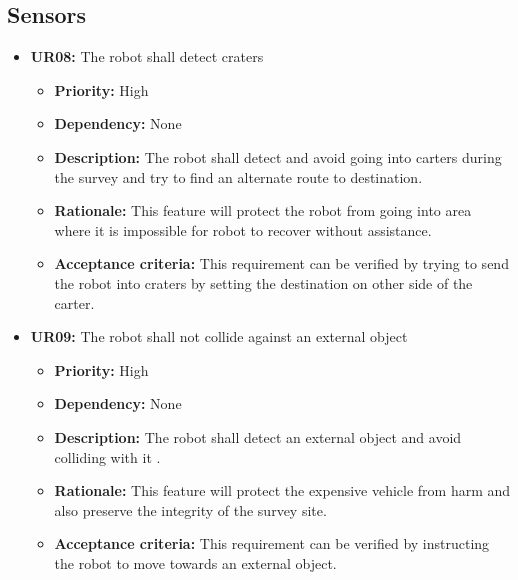 \documentclass[10pt,a4paper,titlepage]{article}
\begin{document}
	\subsection{Sensors}
  
    \begin{itemize}
		\item \textbf{UR08:} The robot shall detect craters
		\begin{itemize}
			\item \textbf{Priority:} High
            \item \textbf{Dependency:} None
			\item \textbf{Description:} The robot shall detect and avoid going into carters during the survey and try to find an alternate route to destination. 
            \item \textbf{Rationale:} This feature will protect the robot from going into area where it is impossible for robot to recover without assistance. 
            \item \textbf{Acceptance criteria:} This requirement can be verified by trying to send the robot into craters by setting the destination on other side of the carter. 
		\end{itemize} 
	\end{itemize}  
    \begin{itemize}
		\item \textbf{UR09:} The robot shall not collide against an external object
		\begin{itemize}
			\item \textbf{Priority:} High
            \item \textbf{Dependency:} None
			\item \textbf{Description:} The robot shall detect an external object and avoid colliding with it . 
            \item \textbf{Rationale:} This feature will protect the expensive vehicle from harm and also preserve the integrity of the survey site. 
            \item \textbf{Acceptance criteria:} This requirement can be verified by instructing the robot to move towards an external object. 
		\end{itemize} 
	\end{itemize}
\end{document}
